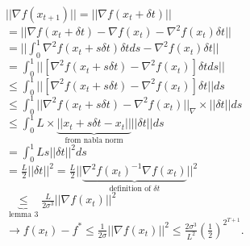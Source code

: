 \documentclass[main]{subfiles}
\begin{document}
$||\nabla f(x_{t+1})|| = ||\nabla f(x_t + \delta t)||$\\
$= ||\nabla f(x_t + \delta t) - \nabla f(x_t) - \nabla^2 f(x_t) \delta t ||$\\
$= || \int_{0}^{1} \nabla^2 f(x_t + s \delta t) \delta t ds - \nabla^2 f(x_t)
\delta t||$\\
$= \int_{0}^{1} ||[ \nabla^2 f(x_t + s \delta t) - \nabla^2 f(x_t) ] \delta t
ds||$\\
$\leq \int_{0}^{1} ||[\nabla^2 f(x_t + s\delta t) - \nabla^2 f(x_t)] \delta t||
ds$\\
$\leq \int_{0}^{1} ||\nabla^2 f(x_t + s\delta t) - \nabla^2 f(x_t)||_\nabla
\times ||\delta t|| ds$\\
$\leq \int_{0}^{1} L \times \underbrace{||x_t + s\delta t - x_t||}_{\text{from
nabla norm}} || \delta t|| ds$\\
$= \int_0^1 L s ||\delta t||^2 ds$ \\
$= \frac{L}{2} || \delta t||^2 = \frac{L}{2} || \underbrace{\nabla^2
f(x_t)^{-1} \nabla f(x_t)}_{\text{definition of $\delta t$}} ||^2$\\
$\underbrace{\leq}_{\text{lemma 3}} \frac{L}{2 \sigma^3} ||\nabla f(x_t)||^2$\\
$\rightarrow f(x_t) - f^* \leq \frac{1}{2 \sigma} ||\nabla f(x_t)||^2 \leq
\frac{2 \sigma^3}{L^2} (\frac{1}{2})^{2^{T+1}}$.
\end{document}
